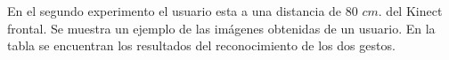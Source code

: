 
En el segundo experimento el usuario esta a una distancia de $80$ $cm.$ del Kinect frontal. Se muestra un ejemplo de las imágenes obtenidas de un usuario. En la tabla se encuentran los resultados del reconocimiento de los dos gestos.   

\begin{figure}[h!]
\centering
{}

\end{figure}
